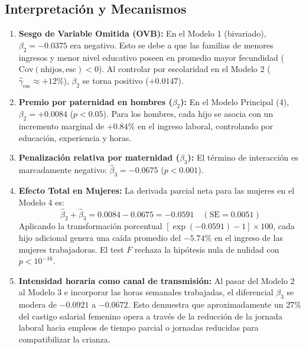 \documentclass[11pt,a4paper]{article}
\begin{document}
\subsection{Interpretación y Mecanismos}
\begin{enumerate}
    \item \textbf{Sesgo de Variable Omitida (OVB):} En el Modelo 1 (bivariado), $\beta_2 = -0.0375$ era negativo. Esto se debe a que las familias de menores ingresos y menor nivel educativo poseen en promedio mayor fecundidad ($\text{Cov}(\text{nhijos}, \text{esc}) < 0$). Al controlar por escolaridad en el Modelo 2 ($\hat{\gamma}_{\text{esc}} \approx +12\%$), $\beta_2$ se torna positivo ($+0.0147$).
    \item \textbf{Premio por paternidad en hombres ($\beta_2$):} En el Modelo Principal (4), $\beta_2 = +0.0084$ ($p < 0.05$). Para los hombres, cada hijo se asocia con un incremento marginal de $+0.84\%$ en el ingreso laboral, controlando por educación, experiencia y horas.
    \item \textbf{Penalización relativa por maternidad ($\beta_3$):} El término de interacción es marcadamente negativo: $\hat{\beta}_3 = -0.0675$ ($p < 0.001$).
    \item \textbf{Efecto Total en Mujeres:} La derivada parcial neta para las mujeres en el Modelo 4 es:
    \begin{equation*}
        \hat{\beta}_2 + \hat{\beta}_3 = 0.0084 - 0.0675 = -0.0591 \quad (\text{SE} = 0.0051)
    \end{equation*}
    Aplicando la transformación porcentual $[\exp(-0.0591) - 1] \times 100$, cada hijo adicional genera una caída promedio del \textbf{$-5.74\%$} en el ingreso de las mujeres trabajadoras. El test $F$ rechaza la hipótesis nula de nulidad con $p < 10^{-16}$.
    \item \textbf{Intensidad horaria como canal de transmisión:} Al pasar del Modelo 2 al Modelo 3 e incorporar las horas semanales trabajadas, el diferencial $\beta_3$ se modera de $-0.0921$ a $-0.0672$. Esto demuestra que aproximadamente un 27\% del castigo salarial femenino opera a través de la reducción de la jornada laboral hacia empleos de tiempo parcial o jornadas reducidas para compatibilizar la crianza.
\end{enumerate}

\end{document}
